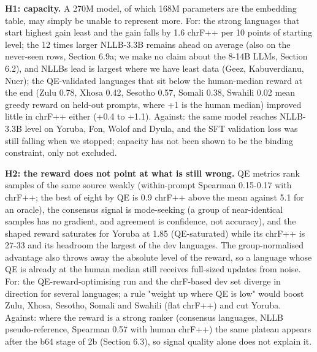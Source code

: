 \textbf{H1: capacity.} A 270M model, of which 168M parameters are the embedding table, may simply be unable to represent more. For: the strong languages that start highest gain least and the gain falls by 1.6 chrF++ per 10 points of starting level; the 12 times larger NLLB-3.3B remains ahead on average (also on the never-seen rows, Section 6.9a; we make no claim about the 8-14B LLMs, Section 6.2), and NLLB\textquotesingle s lead is largest where we have least data (Ge\textquotesingle ez, Kabuverdianu, Nuer); the QE-validated languages that sit below the human-median reward at the end (Zulu 0.78, Xhosa 0.42, Sesotho 0.57, Somali 0.38, Swahili 0.02 mean greedy reward on held-out prompts, where +1 is the human median) improved little in chrF++ either (+0.4 to +1.1). Against: the same model reaches NLLB-3.3B level on Yoruba, Fon, Wolof and Dyula, and the SFT validation loss was still falling when we stopped; capacity has not been shown to be the binding constraint, only not excluded.

\textbf{H2: the reward does not point at what is still wrong.} QE metrics rank samples of the same source weakly (within-prompt Spearman 0.15-0.17 with chrF++; the best of eight by QE is 0.9 chrF++ above the mean against 5.1 for an oracle), the consensus signal is mode-seeking (a group of near-identical samples has no gradient, and agreement is confidence, not accuracy), and the shaped reward saturates for Yoruba at 1.85 (QE-saturated) while its chrF++ is 27-33 and its headroom the largest of the dev languages. The group-normalised advantage also throws away the absolute level of the reward, so a language whose QE is already at the human median still receives full-sized updates from noise. For: the QE-reward-optimising run and the chrF-based dev set diverge in direction for several languages; a rule "weight up where QE is low" would boost Zulu, Xhosa, Sesotho, Somali and Swahili (flat chrF++) and cut Yoruba. Against: where the reward is a strong ranker (consensus languages, NLLB pseudo-reference, Spearman 0.57 with human chrF++) the same plateau appears after the b64 stage of 2b (Section 6.3), so signal quality alone does not explain it.

